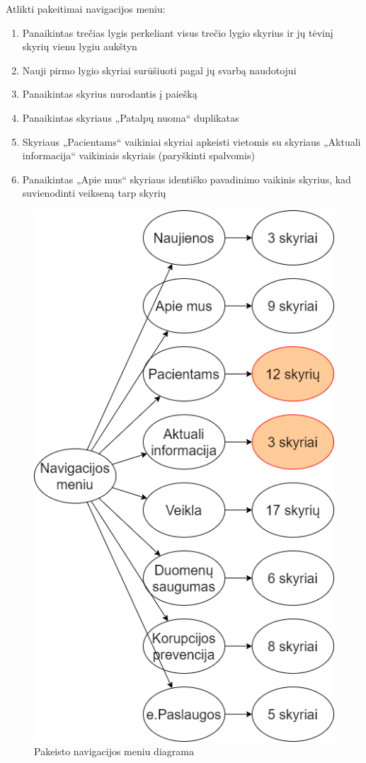 \documentclass{VUMIFPSbakalaurinis}
\begin{document}
Atlikti pakeitimai navigacijos meniu:
\begin{enumerate}
	\item Panaikintas trečias lygis perkeliant visus trečio lygio skyrius ir jų tėvinį skyrių vienu lygiu aukštyn
	\item Nauji pirmo lygio skyriai surūšiuoti pagal jų svarbą naudotojui
	\item Panaikintas skyrius nurodantis į paiešką
	\item Panaikintas skyriaus „Patalpų nuoma“ duplikatas
	\item Skyriaus „Pacientams“ vaikiniai skyriai apkeisti vietomis su skyriaus „Aktuali informacija“ vaikiniais skyriais (paryškinti spalvomis)
	\item Panaikintas „Apie mus“ skyriaus identiško pavadinimo vaikinis skyrius, kad suvienodinti veikseną tarp skyrių
\end{enumerate}

\begin{figure}[htb]
    \centering
    \includegraphics[scale=0.65]{img/NavigacijosMeniuPakeistas}
    \caption{Pakeisto navigacijos meniu diagrama}
    \label{img:NavigacijosMeniuPakeistas}
\end{figure}
\end{document}
